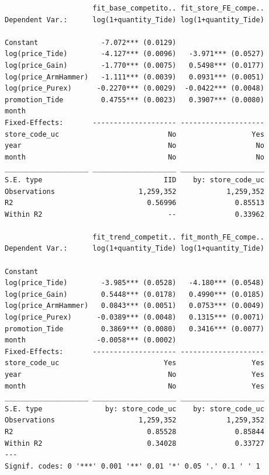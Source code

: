\documentclass[
]{article}
\begin{document}
\begin{verbatim}
                     fit_base_competito.. fit_store_FE_compe..
Dependent Var.:      log(1+quantity_Tide) log(1+quantity_Tide)
                                                              
Constant               -7.072*** (0.0129)                     
log(price_Tide)        -4.127*** (0.0096)   -3.971*** (0.0527)
log(price_Gain)        -1.770*** (0.0075)   0.5498*** (0.0177)
log(price_ArmHammer)   -1.111*** (0.0039)   0.0931*** (0.0051)
log(price_Purex)      -0.2270*** (0.0029)  -0.0422*** (0.0048)
promotion_Tide         0.4755*** (0.0023)   0.3907*** (0.0080)
month                                                         
Fixed-Effects:       -------------------- --------------------
store_code_uc                          No                  Yes
year                                   No                   No
month                                  No                   No
____________________ ____________________ ____________________
S.E. type                             IID    by: store_code_uc
Observations                    1,259,352            1,259,352
R2                                0.56996              0.85513
Within R2                              --              0.33962

                     fit_trend_competit.. fit_month_FE_compe..
Dependent Var.:      log(1+quantity_Tide) log(1+quantity_Tide)
                                                              
Constant                                                      
log(price_Tide)        -3.985*** (0.0528)   -4.180*** (0.0548)
log(price_Gain)        0.5448*** (0.0178)   0.4990*** (0.0185)
log(price_ArmHammer)   0.0843*** (0.0051)   0.0753*** (0.0049)
log(price_Purex)      -0.0389*** (0.0048)   0.1315*** (0.0071)
promotion_Tide         0.3869*** (0.0080)   0.3416*** (0.0077)
month                 -0.0058*** (0.0002)                     
Fixed-Effects:       -------------------- --------------------
store_code_uc                         Yes                  Yes
year                                   No                  Yes
month                                  No                  Yes
____________________ ____________________ ____________________
S.E. type               by: store_code_uc    by: store_code_uc
Observations                    1,259,352            1,259,352
R2                                0.85528              0.85844
Within R2                         0.34028              0.33727
---
Signif. codes: 0 '***' 0.001 '**' 0.01 '*' 0.05 '.' 0.1 ' ' 1
\end{verbatim}
\end{document}
